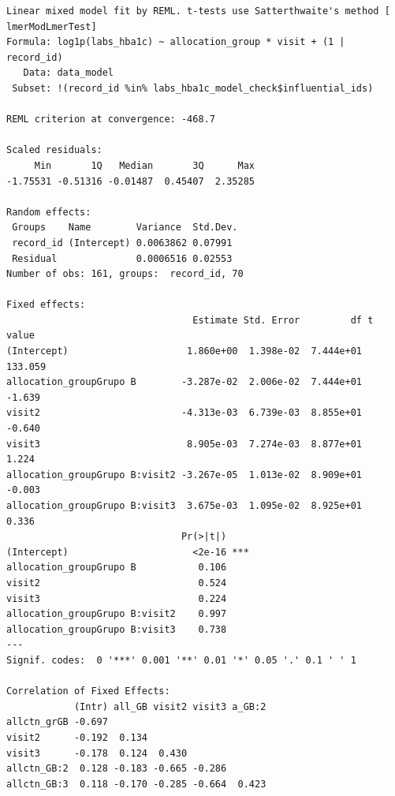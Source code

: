 \documentclass[
  letterpaper,
  DIV=11,
  numbers=noendperiod]{scrartcl}
\newenvironment{Shaded}{\begin{snugshade}}{\end{snugshade}}
\newcommand{\NormalTok}[1]{\textcolor[rgb]{0.00,0.23,0.31}{#1}}
\newcommand{\SpecialCharTok}[1]{\textcolor[rgb]{0.37,0.37,0.37}{#1}}
\begin{document}
\begin{verbatim}
Linear mixed model fit by REML. t-tests use Satterthwaite's method [
lmerModLmerTest]
Formula: log1p(labs_hba1c) ~ allocation_group * visit + (1 | record_id)
   Data: data_model
 Subset: !(record_id %in% labs_hba1c_model_check$influential_ids)

REML criterion at convergence: -468.7

Scaled residuals: 
     Min       1Q   Median       3Q      Max 
-1.75531 -0.51316 -0.01487  0.45407  2.35285 

Random effects:
 Groups    Name        Variance  Std.Dev.
 record_id (Intercept) 0.0063862 0.07991 
 Residual              0.0006516 0.02553 
Number of obs: 161, groups:  record_id, 70

Fixed effects:
                                 Estimate Std. Error         df t value
(Intercept)                     1.860e+00  1.398e-02  7.444e+01 133.059
allocation_groupGrupo B        -3.287e-02  2.006e-02  7.444e+01  -1.639
visit2                         -4.313e-03  6.739e-03  8.855e+01  -0.640
visit3                          8.905e-03  7.274e-03  8.877e+01   1.224
allocation_groupGrupo B:visit2 -3.267e-05  1.013e-02  8.909e+01  -0.003
allocation_groupGrupo B:visit3  3.675e-03  1.095e-02  8.925e+01   0.336
                               Pr(>|t|)    
(Intercept)                      <2e-16 ***
allocation_groupGrupo B           0.106    
visit2                            0.524    
visit3                            0.224    
allocation_groupGrupo B:visit2    0.997    
allocation_groupGrupo B:visit3    0.738    
---
Signif. codes:  0 '***' 0.001 '**' 0.01 '*' 0.05 '.' 0.1 ' ' 1

Correlation of Fixed Effects:
            (Intr) all_GB visit2 visit3 a_GB:2
allctn_grGB -0.697                            
visit2      -0.192  0.134                     
visit3      -0.178  0.124  0.430              
allctn_GB:2  0.128 -0.183 -0.665 -0.286       
allctn_GB:3  0.118 -0.170 -0.285 -0.664  0.423
\end{verbatim}

\begin{Shaded}
\end{Shaded}
\end{document}
